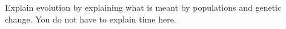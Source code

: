 \showpoints

\question[4]
Explain evolution by explaining what is meant by populations and genetic change. You do not have to explain time here.





%



